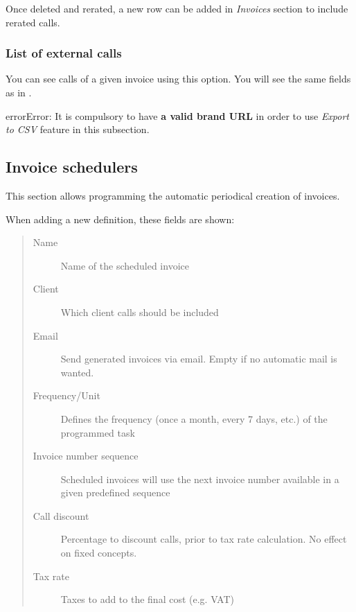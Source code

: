 \documentclass[letterpaper,10pt,spanish]{sphinxmanual}
\begin{document}
Once deleted and rerated, a new row can be added in \emph{Invoices} section to include rerated calls.


\subsubsection{List of external calls}
\label{administration_portal/brand/invoicing/invoices:list-of-external-calls}
You can see calls of a given invoice using this option. You will see the same fields as in {\hyperref[administration_portal/platform/external_calls:external\string-calls]{}}.

\begin{notice}{error}{Error:}
It is compulsory to have \textbf{a valid brand URL} in order to use \emph{Export to CSV} feature in this subsection.
\end{notice}


\subsection{Invoice schedulers}
\label{administration_portal/brand/invoicing/invoice_schedulers::doc}\label{administration_portal/brand/invoicing/invoice_schedulers:invoice-schedulers}\label{administration_portal/brand/invoicing/invoice_schedulers:id1}
This section allows programming the automatic periodical creation of invoices.

When adding a new definition, these fields are shown:
\begin{quote}
\begin{description}
\item[{Name}] \leavevmode
Name of the scheduled invoice

\item[{Client}] \leavevmode
Which client calls should be included

\item[{Email}] \leavevmode
Send generated invoices via email. Empty if no automatic mail is wanted.

\item[{Frequency/Unit}] \leavevmode
Defines the frequency (once a month, every 7 days, etc.) of the programmed task

\item[{Invoice number sequence}] \leavevmode
Scheduled invoices will use the next invoice number available in a given predefined sequence

\item[{Call discount}] \leavevmode
Percentage to discount calls, prior to tax rate calculation. No effect on fixed concepts.

\item[{Tax rate}] \leavevmode
Taxes to add to the final cost (e.g. VAT)

\end{description}
\end{quote}
\end{document}
